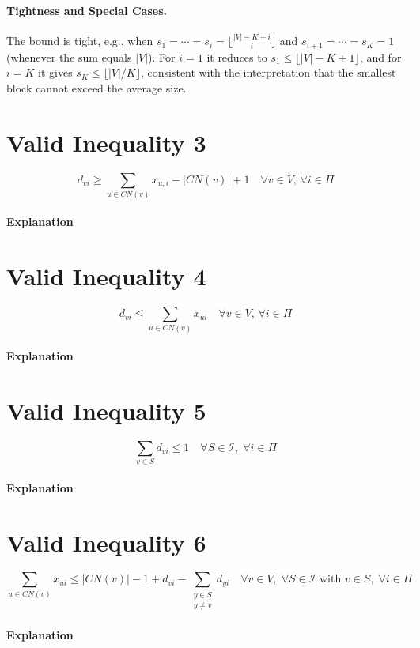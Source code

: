 \paragraph{Tightness and Special Cases.}
The bound is tight, e.g., when $s_1=\cdots=s_i=\big\lfloor \frac{|V|-K+i}{i} \big\rfloor$
and $s_{i+1}=\cdots=s_K=1$ (whenever the sum equals $|V|$). For $i=1$ it reduces to
$s_1 \le \lfloor |V|-K+1 \rfloor$, and for $i=K$ it gives
$s_K \le \lfloor |V|/K \rfloor$, consistent with the interpretation that the smallest
block cannot exceed the average size.

\section{Valid Inequality 3}
\begin{equation}
    d_{vi} \geq \sum_{u \in CN(v)} x_{u,i} - |CN(v)| + 1 \quad \forall v \in V,\, \forall i \in \Pi
\end{equation}
\paragraph{Explanation}

\section{Valid Inequality 4}
\begin{equation}
    d_{vi} \leq \sum_{u \in CN(v)} x_{ui} \quad \forall v \in V,\, \forall i \in \Pi
\end{equation}
\paragraph{Explanation}

\section{Valid Inequality 5}
\begin{equation}
    \sum_{v \in S} d_{vi} \leq 1 \quad \forall S \in \mathcal{I},\; \forall i \in \Pi
\end{equation}
\paragraph{Explanation}

\section{Valid Inequality 6}
\begin{equation}
    \sum_{u \in CN(v)} x_{ui} \leq |CN(v)| - 1 + d_{vi} - \sum_{\substack{y \in S \\ y \neq v}} d_{yi} \quad \forall v \in V,\; \forall S \in \mathcal{I} \text{ with } v \in S,\; \forall i \in \Pi
\end{equation}
\paragraph{Explanation}
